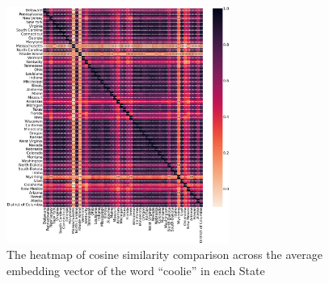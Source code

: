 \documentclass[11pt]{article}
\begin{document}
\begin{figure}[h!]
  \centering
  \includegraphics[width=0.65\textwidth]{heatmap-token-200.pdf}
  \caption{The heatmap of cosine similarity comparison across the average embedding vector of the word ``coolie'' in each State}
  \label{fig:heatmap}
\end{figure}
\end{document}
